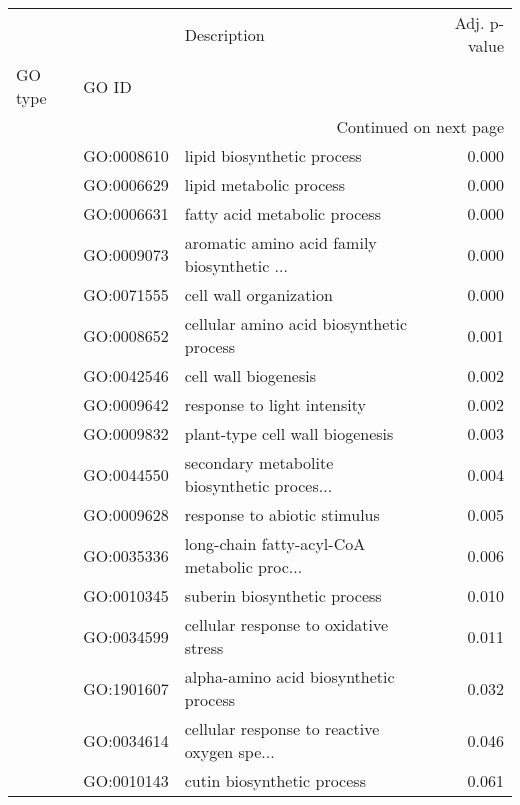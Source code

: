 \begin{longtable}{lllr}
\toprule
   &            &                                  Description &  Adj. p-value \\
GO type & GO ID &                                              &               \\
\midrule
\endhead
\midrule
\multicolumn{4}{r}{{Continued on next page}} \\
\midrule
\endfoot

\bottomrule
\endlastfoot
\multirow{20}{*}{BP} & GO:0008610 &                   lipid biosynthetic process &         0.000 \\
   & GO:0006629 &                      lipid metabolic process &         0.000 \\
   & GO:0006631 &                 fatty acid metabolic process &         0.000 \\
   & GO:0009073 &  aromatic amino acid family biosynthetic ... &         0.000 \\
   & GO:0071555 &                       cell wall organization &         0.000 \\
   & GO:0008652 &     cellular amino acid biosynthetic process &         0.001 \\
   & GO:0042546 &                         cell wall biogenesis &         0.002 \\
   & GO:0009642 &                  response to light intensity &         0.002 \\
   & GO:0009832 &              plant-type cell wall biogenesis &         0.003 \\
   & GO:0044550 &  secondary metabolite biosynthetic proces... &         0.004 \\
   & GO:0009628 &                 response to abiotic stimulus &         0.005 \\
   & GO:0035336 &  long-chain fatty-acyl-CoA metabolic proc... &         0.006 \\
   & GO:0010345 &                 suberin biosynthetic process &         0.010 \\
   & GO:0034599 &        cellular response to oxidative stress &         0.011 \\
   & GO:1901607 &        alpha-amino acid biosynthetic process &         0.032 \\
   & GO:0034614 &  cellular response to reactive oxygen spe... &         0.046 \\
   & GO:0010143 &                   cutin biosynthetic process &         0.061 \\

\end{longtable}
